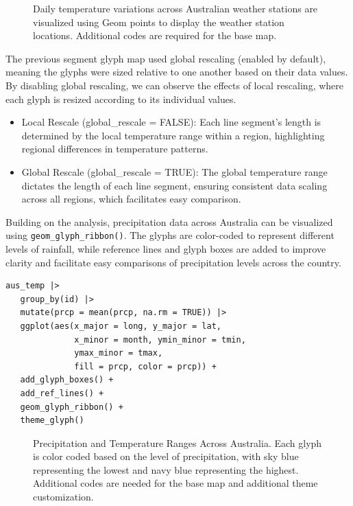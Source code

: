 \begin{figure}
\centering
{}
\caption{\label{fig:unnamed-chunk-9}Daily temperature variations across Australian weather stations are visualized using Geom points to display the weather station locations. Additional codes are required for the base map.}
\end{figure}

The previous segment glyph map used global rescaling (enabled by default), meaning the glyphs were sized relative to one another based on their data values. By disabling global rescaling, we can observe the effects of local rescaling, where each glyph is resized according to its individual values.

\begin{itemize}
\tightlist
\item
  Local Rescale (global\_rescale = FALSE): Each line segment's length is determined by the local temperature range within a region, highlighting regional differences in temperature patterns.
\item
  Global Rescale (global\_rescale = TRUE): The global temperature range dictates the length of each line segment, ensuring consistent data scaling across all regions, which facilitates easy comparison.
\end{itemize}

Building on the analysis, precipitation data across Australia can be visualized using \texttt{geom\_glyph\_ribbon()}. The glyphs are color-coded to represent different levels of rainfall, while reference lines and glyph boxes are added to improve clarity and facilitate easy comparisons of precipitation levels across the country.

\begin{verbatim}
aus_temp |>
   group_by(id) |>
   mutate(prcp = mean(prcp, na.rm = TRUE)) |>
   ggplot(aes(x_major = long, y_major = lat,
              x_minor = month, ymin_minor = tmin,
              ymax_minor = tmax, 
              fill = prcp, color = prcp)) +
   add_glyph_boxes() +
   add_ref_lines() +
   geom_glyph_ribbon() +
   theme_glyph()
\end{verbatim}

\begin{figure}
\centering
{}
\caption{\label{fig:unnamed-chunk-11}Precipitation and Temperature Ranges Across Australia. Each glyph is color coded based on the level of precipitation, with sky blue representing the lowest and navy blue representing the highest. Additional codes are needed for the base map and additional theme customization.}
\end{figure}

